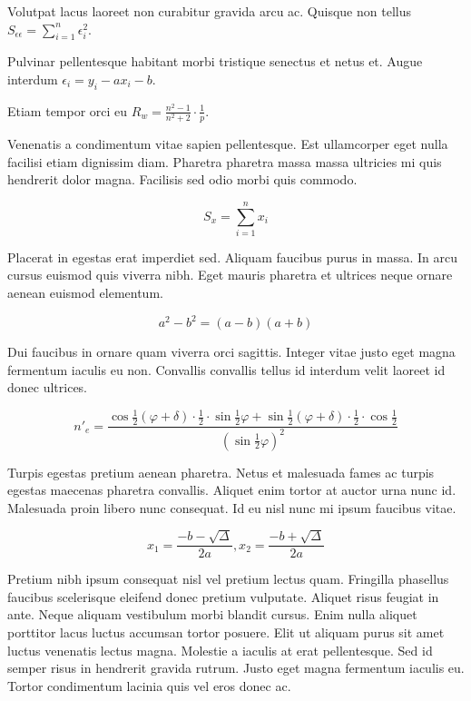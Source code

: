 \documentclass{article}
\begin{document}
Volutpat lacus laoreet non curabitur gravida arcu ac. Quisque non tellus \begin{math}
	S_{\epsilon \epsilon}=\sum_{i=1}^{n}\epsilon_i^2
\end{math}.\newline

Pulvinar pellentesque habitant morbi tristique senectus et netus et. Augue interdum $ \epsilon_i=y_i-ax_i-b $.\newline

Etiam tempor orci eu \( R_w=\frac{n^2-1}{n^2+2} \cdot \frac{1}{p} \).\newline

Venenatis a condimentum vitae sapien pellentesque. Est ullamcorper eget nulla facilisi etiam dignissim diam. Pharetra pharetra massa massa ultricies mi quis hendrerit dolor magna. Facilisis sed odio morbi quis commodo.

\[ S_x=\sum_{i=1}^{n}x_i \]

Placerat in egestas erat imperdiet sed. Aliquam faucibus purus in massa. In arcu cursus euismod quis viverra nibh. Eget mauris pharetra et ultrices neque ornare aenean euismod elementum.

$$ a^2-b^2=(a-b)(a+b) $$

Dui faucibus in ornare quam viverra orci sagittis. Integer vitae justo eget magna fermentum iaculis eu non. Convallis convallis tellus id interdum velit laoreet id donec ultrices. 

\begin{displaymath}
	n'_e=\frac{\cos \frac{1}{2}(\varphi +\delta)\cdot \frac{1}{2} \cdot \sin \frac{1}{2} \varphi + \sin \frac{1}{2}(\varphi +\delta)\cdot \frac{1}{2} \cdot \cos \frac{1}{2} }{(\sin \frac{1}{2}\varphi)^2}
\end{displaymath}

Turpis egestas pretium aenean pharetra. Netus et malesuada fames ac turpis egestas maecenas pharetra convallis. Aliquet enim tortor at auctor urna nunc id. Malesuada proin libero nunc consequat. Id eu nisl nunc mi ipsum faucibus vitae.

\begin{equation}
	x_1=\frac{-b-\sqrt{\Delta}}{2a},x_2=\frac{-b+\sqrt{\Delta}}{2a}
\end{equation}

Pretium nibh ipsum consequat nisl vel pretium lectus quam. Fringilla phasellus faucibus scelerisque eleifend donec pretium vulputate. Aliquet risus feugiat in ante. Neque aliquam vestibulum morbi blandit cursus. Enim nulla aliquet porttitor lacus luctus accumsan tortor posuere. Elit ut aliquam purus sit amet luctus venenatis lectus magna. Molestie a iaculis at erat pellentesque. Sed id semper risus in hendrerit gravida rutrum. Justo eget magna fermentum iaculis eu. Tortor condimentum lacinia quis vel eros donec ac.
\end{document}
